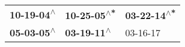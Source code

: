 \begin{supertabular}{lll}
 \textbf{10-19-04\textsuperscript{$\wedge$}} &  \textbf{10-25-05\textsuperscript{$\wedge$*}} &  \textbf{03-22-14\textsuperscript{$\wedge$*}} \\
 \textbf{05-03-05\textsuperscript{$\wedge$}} &   \textbf{03-19-11\textsuperscript{$\wedge$}} &                    03-16-17\textsuperscript{} \\
\end{supertabular}
